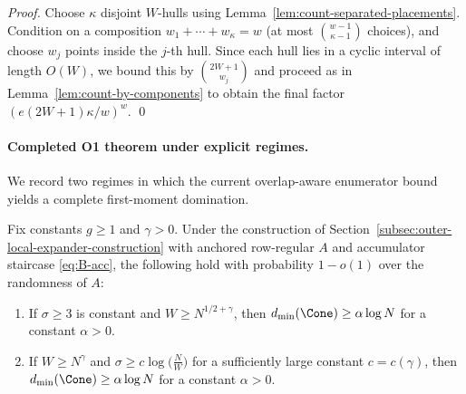 \begin{proof}
Choose $\kappa$ disjoint $W$-hulls using Lemma~\ref{lem:count-separated-placements}.
Condition on a composition $w_1+\cdots+w_\kappa=w$ (at most $\binom{w-1}{\kappa-1}$ choices), and choose $w_j$ points
inside the $j$-th hull. Since each hull lies in a cyclic interval of length $O(W)$, we bound this by
$\binom{2W+1}{w_j}$ and proceed as in Lemma~\ref{lem:count-by-components} to obtain the final factor
$(e(2W+1)\kappa/w)^w$.
\qed
\end{proof}

\paragraph{Completed O1 theorem under explicit regimes.}
We record two regimes in which the current overlap-aware enumerator bound yields a complete first-moment domination.

\begin{theorem}
\label{thm:outer-local-expander-logdist-regimes}
Fix constants $g\ge 1$ and $\gamma>0$.
Under the construction of Section~\ref{subsec:outer-local-expander-construction} with anchored row-regular $A$ and
accumulator staircase \eqref{eq:B-acc}, the following hold with probability $1-o(1)$ over the randomness of $A$:
\begin{enumerate}
\item[\textup{(R1)}] If $\sigma\ge 3$ is constant and $W\ge N^{1/2+\gamma}$, then
      $d_{\min}(\Cone)\ge \alpha\log N$ for a constant $\alpha>0$.
\item[\textup{(R2)}] If $W\ge N^{\gamma}$ and $\sigma\ge c\log\!\big(\frac{N}{W}\big)$ for a sufficiently large constant
      $c=c(\gamma)$, then $d_{\min}(\Cone)\ge \alpha\log N$ for a constant $\alpha>0$.
\end{enumerate}
\end{theorem}

